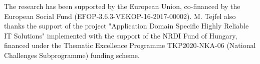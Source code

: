\documentclass[sigconf]{acmart}
\begin{document}
\begin{acks}
The research has been supported by the European Union, co-financed by the European Social Fund 
(EFOP-3.6.3-VEKOP-16-2017-00002). M. Tejfel also thanks the support of the project
"Application Domain Specific Highly Reliable IT Solutions" implemented with the support of the NRDI Fund
of Hungary, financed under the Thematic Excellence Programme TKP2020-NKA-06 (National Challenges Subprogramme) funding scheme.
\end{acks}



\end{document}

